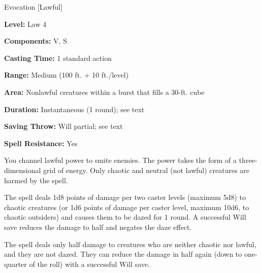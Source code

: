 
Evocation [Lawful]

\textbf{Level:} Law 4

\textbf{Components:} V, S

\textbf{Casting Time:} 1 standard action

\textbf{Range:} Medium (100 ft. + 10 ft./level)

\textbf{Area:} Nonlawful creatures within a burst that fills a 30-ft. cube

\textbf{Duration:} Instantaneous (1 round); see text

\textbf{Saving Throw:} Will partial; see text

\textbf{Spell Resistance:} Yes

You channel lawful power to smite enemies. The power takes the form of a three-dimensional 
grid of energy. Only chaotic and neutral (not lawful) creatures are harmed by the 
spell.

The spell deals 1d8 points of damage per two caster levels (maximum 5d8) to chaotic 
creatures (or 1d6 points of damage per caster level, maximum 10d6, to chaotic outsiders) 
and causes them to be dazed for 1 round. A successful Will save reduces the damage 
to half and negates the daze effect.

The spell deals only half damage to creatures who are neither chaotic nor lawful, 
and they are not dazed. They can reduce the damage in half again (down to one-quarter 
of the roll) with a successful Will save.

